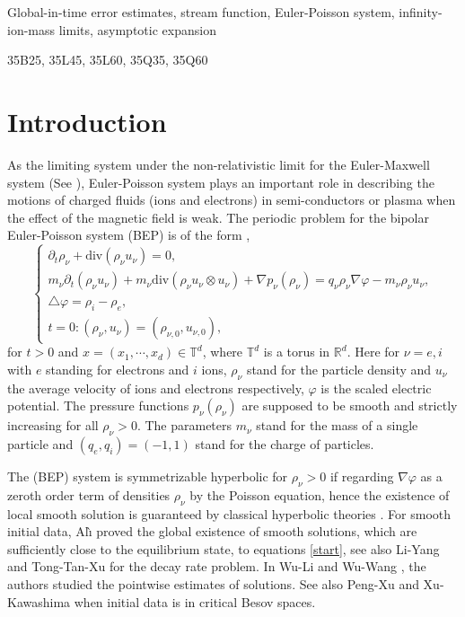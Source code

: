 \documentclass[reqno,twoside,12pt,a4paper]{amsart}
\newcommand{\R}{\mathbb{R}}
\newcommand{\T}{\mathbb{T}}
\newcommand{\pt}{\partial_t}
\newcommand{\D}{\nabla}
\newcommand{\vp}{\varphi}
\numberwithin{equation}{section}
\begin{document}
	\vspace{7mm}
	
	 Global-in-time error estimates, stream function, Euler-Poisson system, infinity-ion-mass limits, asymptotic expansion
	
	\vspace{5mm}
	
	  35B25, 35L45, 35L60, 35Q35, 35Q60
	
	\vspace{5mm}
	
	\section{Introduction}
 As the limiting system under the non-relativistic limit for the Euler-Maxwell system (See \cite{Peng2007,Peng2017,Wasiolek2016}), Euler-Poisson system plays an important role in describing the motions of charged fluids (ions and electrons) in semi-conductors or plasma when the effect of the magnetic field is weak. The periodic problem for the bipolar Euler-Poisson system (BEP) is of the form \cite{Ali2003,Chen1984,Markowich1990},
\begin{equation}\label{start}
\begin{cases}
\pt\rho_{\nu}+\mathrm{div}\left(\rho_{\nu}u_{\nu}\right)=0,
\\
m_{\nu}\pt\left(\rho_{\nu}u_{\nu}\right)+m_{\nu}\mathrm{div}\left(\rho_{\nu}u_{\nu}\otimes u_{\nu}\right)+\nabla p_\nu(\rho_\nu)=q_\nu \rho_\nu\nabla \vp-m_\nu\rho_\nu u_\nu,\\
\triangle \vp=\rho_i-\rho_e,\\
t=0: (\rho_\nu,u_\nu) = (\rho_{\nu,0},u_{\nu,0}),
\end{cases}
\end{equation}
for $t>0$ and $x=(x_1,\cdots,x_d)\in\T^d$, where $\T^d$ is a torus in $\R^d$. Here for $\nu=e,i$ with $e$ standing for electrons and $i$ ions, $ \rho_\nu$ stand for the particle density and $u_\nu$ the average velocity of ions and electrons respectively, $ \vp $  is the scaled electric potential. The pressure functions $ p_\nu(\rho_\nu) $
are supposed to be smooth and strictly increasing for all $ \rho_\nu > 0 $.  The parameters $m_\nu$ stand for the mass of a single particle and $(q_e,q_i)=(-1,1)$ stand for the charge of particles. 

The (BEP) system is symmetrizable hyperbolic for $\rho_{\nu}>0$ if regarding $\D \vp$ as a zeroth order term of densities $\rho_\nu$ by the Poisson equation, hence the existence of  local smooth solution is guaranteed by classical hyperbolic theories \cite{Kato1975,Lax1973,Majda1984}. For smooth initial data, Al{\`\i} \cite{Ali2003} proved the global existence of smooth solutions,
which are sufficiently close to the equilibrium state, to equations \eqref{start}, see also Li-Yang \cite{Li2012} and Tong-Tan-Xu \cite{Tong2020} for the decay rate problem. In Wu-Li \cite{Wu2016} and Wu-Wang \cite{Wu2014}, the authors studied the pointwise estimates of solutions. See also Peng-Xu \cite{P2013} and Xu-Kawashima \cite{Xu2015} when initial data is in critical Besov spaces.
\end{document}
